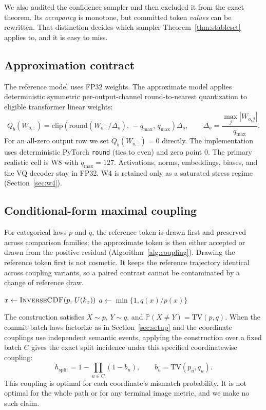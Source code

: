 \documentclass[11pt,a4paper]{article}
\theoremstyle{plain}
\theoremstyle{definition}
\theoremstyle{remark}
\newcommand{\TV}{\mathrm{TV}}
\newcommand{\Prob}{\mathbb{P}}
\begin{document}
We also audited the confidence sampler and then excluded it from the exact
theorem. Its \emph{occupancy} is monotone, but committed token \emph{values} can
be rewritten. That distinction decides which sampler Theorem~\ref{thm:stableset}
applies to, and it is easy to miss.

\subsection{Approximation contract}
The reference model uses FP32 weights. The approximate model applies
deterministic symmetric per-output-channel round-to-nearest quantization to
eligible transformer linear weights:
\[
  Q_b(W_{o,:}) = \mathrm{clip}\!\left(
    \mathrm{round}(W_{o,:}/\Delta_o),\, -q_{\max},\, q_{\max}\right)\Delta_o,
  \qquad
  \Delta_o = \frac{\max_j |W_{o,j}|}{q_{\max}} .
\]
For an all-zero output row we set $Q_b(W_{o,:})=0$ directly. The implementation
uses deterministic PyTorch \texttt{round} (ties to even) and zero point 0. The
primary realistic cell is W8 with $q_{\max}=127$. Activations, norms,
embeddings, biases, and the VQ decoder stay in FP32. W4 is retained only as a
saturated stress regime (Section~\ref{sec:w4}).

\subsection{Conditional-form maximal coupling}
\label{sec:coupling}
For categorical laws $p$ and $q$, the reference token is drawn first and
preserved across comparison families; the approximate token is then either
accepted or drawn from the positive residual (Algorithm~\ref{alg:coupling}).
Drawing the reference token first is not cosmetic. It keeps the reference
trajectory identical across coupling variants, so a paired contrast cannot be
contaminated by a change of reference draw.

\begin{algorithm}[t]
\caption{Conditional-form maximal coupling for one token}
\label{alg:coupling}
$x \leftarrow \textsc{InverseCDF}(p,\,U(k_x))$\;
\If{$\TV(p,q)=0$}{\Return $(x,x)$\;}
$a \leftarrow \min\{1,q(x)/p(x)\}$
\eIf{$U(k_a)\le a$}{
  \Return $(x,x)$\;
}{
  $r \leftarrow (q-p)_+/\TV(p,q)$\;
  $y \leftarrow \textsc{InverseCDF}(r,\,U(k_r))$\;
  \Return $(x,y)$\;
}
\end{algorithm}

The construction satisfies $X \sim p$, $Y \sim q$, and
$\Prob(X \neq Y) = \TV(p,q)$. When the commit-batch laws factorize as in Section~\ref{sec:setup} and the
coordinate couplings use independent semantic events, applying the construction
over a fixed batch $C$ gives the exact split incidence under this specified
coordinatewise coupling:
\begin{equation}
\label{eq:incidence}
  h_{\mathrm{split}} = 1 - \prod_{u \in C} (1 - b_u),
  \qquad b_u = \TV(p_u,q_u) .
\end{equation}
This coupling is optimal for each coordinate's mismatch probability. It is not
optimal for the whole path or for any terminal image metric, and we make no such
claim.
\end{document}
